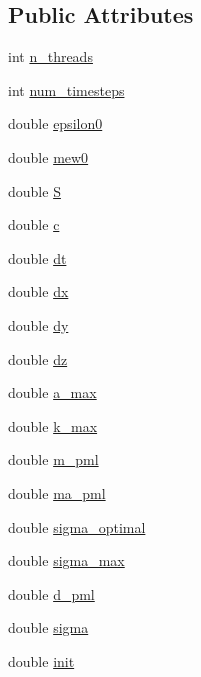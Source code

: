 \subsection*{Public Attributes}
\begin{DoxyCompactItemize}
\item 
int \hyperlink{classmaxwell_a40c465be209366013cfecb984c96fcdb}{n\+\_\+threads}
\item 
int \hyperlink{classmaxwell_a6282670536b066ba81aba77143676d2b}{num\+\_\+timesteps}
\item 
double \hyperlink{classmaxwell_a788555c5fe0593392febb872915e7e0a}{epsilon0}
\item 
double \hyperlink{classmaxwell_a24f927a857400bd7d6e957366e0514e1}{mew0}
\item 
double \hyperlink{classmaxwell_a97ae068093d3316f05b737029c4b848e}{S}
\item 
double \hyperlink{classmaxwell_a3d7831352c618e863583d1b20965f8f7}{c}
\item 
double \hyperlink{classmaxwell_ab01332ef8711870bd42210b8504eb08b}{dt}
\item 
double \hyperlink{classmaxwell_aa12ffa3f8fdf5b3b6b178791ef7bb3bb}{dx}
\item 
double \hyperlink{classmaxwell_a66a88a9d7d85c0f017f6dc74c3423a68}{dy}
\item 
double \hyperlink{classmaxwell_a2b357e4d145be4296d1051c80f96b83a}{dz}
\item 
double \hyperlink{classmaxwell_a04bf51881502360158d883294c1e4564}{a\+\_\+max}
\item 
double \hyperlink{classmaxwell_a77804475f8c95be8f44ddee6f0af0bfe}{k\+\_\+max}
\item 
double \hyperlink{classmaxwell_a9e42905655eafc044c27606eea0dc1c7}{m\+\_\+pml}
\item 
double \hyperlink{classmaxwell_aa2055ecfd573a345dc94aecc12f37511}{ma\+\_\+pml}
\item 
double \hyperlink{classmaxwell_a8e8b89b108a26764f803c39908d474da}{sigma\+\_\+optimal}
\item 
double \hyperlink{classmaxwell_af945b0a905935b2130eeb6c7a33eb478}{sigma\+\_\+max}
\item 
double \hyperlink{classmaxwell_ac0d3b422db5ba08a7fac2d32c408f6a9}{d\+\_\+pml}
\item 
double \hyperlink{classmaxwell_a8e5a54fb0c9fe202e76efd43dbc184c3}{sigma}
\item 
double \hyperlink{classmaxwell_a549079ef29643a667585039522edba4a}{init}
\item 

\end{DoxyCompactItemize}
